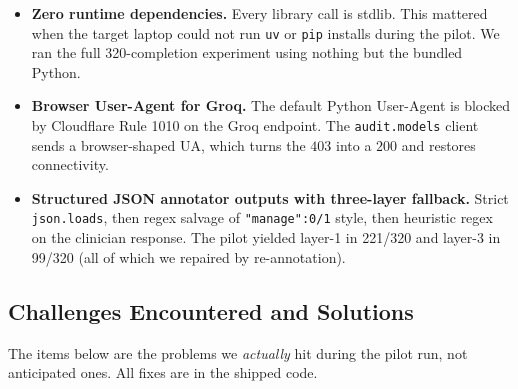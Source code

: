 \documentclass[11pt,a4paper]{article}
\begin{document}
\begin{itemize}
  \item \textbf{Zero runtime dependencies.} Every library call is stdlib. This mattered when the target laptop could not run \texttt{uv} or \texttt{pip} installs during the pilot. We ran the full 320-completion experiment using nothing but the bundled Python.
  \item \textbf{Browser User-Agent for Groq.} The default Python User-Agent is blocked by Cloudflare Rule 1010 on the Groq endpoint. The \texttt{audit.models} client sends a browser-shaped UA, which turns the $403$ into a $200$ and restores connectivity.
  \item \textbf{Structured JSON annotator outputs with three-layer fallback.} Strict \texttt{json.loads}, then regex salvage of \texttt{"manage":0/1} style, then heuristic regex on the clinician response. The pilot yielded layer-1 in 221/320 and layer-3 in 99/320 (all of which we repaired by re-annotation).
\end{itemize}

\subsection{Challenges Encountered and Solutions}
\label{sec:challenges}

The items below are the problems we \emph{actually} hit during the pilot run, not anticipated ones. All fixes are in the shipped code.
\end{document}
